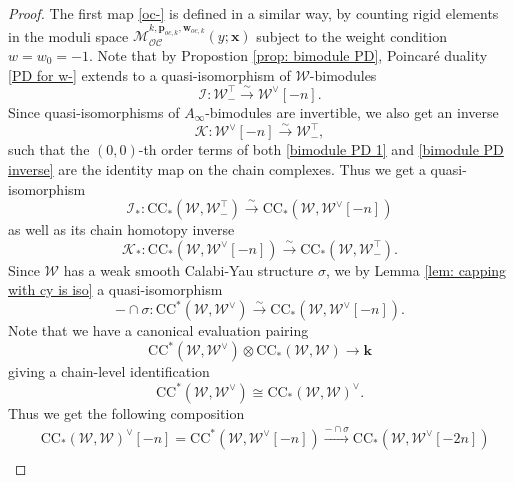 \documentclass[11pt]{amsproc}
\def\K{{\mathbf{k}}}
\def\w{\mathcal{W}(E)}
\def\oc{\mathcal{OC}}
\def\r#1{\mathrm{#1}}
\def\w{\mathcal{W}}
\def\M{\mathcal{M}}
\def\ainf{A_\infty}
\theoremstyle{remark}
\numberwithin{equation}{section}
\begin{document}
\begin{proof}
The first map \eqref{oc-} is defined in a similar way, 
by counting rigid elements in the moduli space $\M_{\oc}^{k, \mathbf{p}_{oc, k}, \mathbf{w}_{oc, k}}(y; \mathbf{x})$ subject to the weight condition $w = w_{0}=-1$.
Note that by Propostion \ref{prop: bimodule PD}, Poincar\'{e} duality \eqref{PD for w-} extends to a quasi-isomorphism of $\w$-bimodules 
\begin{equation}\label{bimodule PD 1}
\mathcal{I}: \w_{-}^{\top} \stackrel{\sim}\to \w^{\vee}[-n].
\end{equation}
Since quasi-isomorphisms of $\ainf$-bimodules are invertible, we also get an inverse
\begin{equation}\label{bimodule PD inverse}
\mathcal{K}: \w^{\vee}[-n] \stackrel{\sim}\to \w_{-}^{\top},
\end{equation}
such that the $(0,0)$-th order terms of both \eqref{bimodule PD 1} and \eqref{bimodule PD inverse} are the identity map on the chain complexes.
Thus we get a quasi-isomorphism
\begin{equation}
\mathcal{I}_{*}: \r{CC}_{*}(\w, \w_{-}^{\top}) \stackrel{\sim}\to \r{CC}_{*}(\w, \w^{\vee}[-n])
\end{equation}
as well as its chain homotopy inverse
\begin{equation}\label{cc PD inverse}
\mathcal{K}_{*}: \r{CC}_{*}(\w, \w^{\vee}[-n]) \stackrel{\sim}\to \r{CC}_{*}(\w, \w_{-}^{\top}).
\end{equation}
Since $\w$ has a weak smooth Calabi-Yau structure $\sigma$,
we by Lemma \ref{lem: capping with cy is iso} a quasi-isomorphism
\begin{equation}\label{capping with cy for w dual}
-\cap \sigma: \r{CC}^{*}(\w, \w^{\vee}) \stackrel{\sim}\to \r{CC}_{*}(\w, \w^{\vee}[-n]).
\end{equation}
Note that we have a canonical evaluation pairing
\begin{equation}\label{evaluation on hochschild}
\r{CC}^{*}(\w, \w^{\vee}) \otimes \r{CC}_{*}(\w, \w) \to \K
\end{equation}
giving a chain-level identification 
\begin{equation}\label{hochschild homology dual}
\r{CC}^{*}(\w, \w^{\vee}) \cong \r{CC}_{*}(\w, \w)^{\vee}.
\end{equation}
Thus we get the following composition
\begin{equation}\label{oc dual}
\begin{split}
& \r{CC}_{*}(\w, \w)^{\vee}[-n] = \r{CC}^{*}(\w, \w^{\vee}[-n]) \stackrel{-\cap \sigma}\to \r{CC}_{*}(\w, \w^{\vee}[-2n])\\

\end{split}
\end{equation}
\end{proof}
\end{document}
